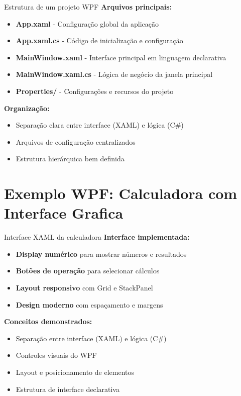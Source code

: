 \documentclass[aspectratio=169]{beamer}
\begin{document}
\begin{frame}{Estrutura de um projeto WPF}
\textbf{Arquivos principais:}
\begin{itemize}
    \item \textbf{App.xaml} - Configuração global da aplicação
    \item \textbf{App.xaml.cs} - Código de inicialização e configuração
    \item \textbf{MainWindow.xaml} - Interface principal em linguagem declarativa
    \item \textbf{MainWindow.xaml.cs} - Lógica de negócio da janela principal
    \item \textbf{Properties/} - Configurações e recursos do projeto
\end{itemize}

\textbf{Organização:}
\begin{itemize}
    \item Separação clara entre interface (XAML) e lógica (C\#)
    \item Arquivos de configuração centralizados
    \item Estrutura hierárquica bem definida
\end{itemize}
\end{frame}

\section{Exemplo WPF: Calculadora com Interface Grafica}

\begin{frame}{Interface XAML da calculadora}
\textbf{Interface implementada:}
\begin{itemize}
    \item \textbf{Display numérico} para mostrar números e resultados
    \item \textbf{Botões de operação} para selecionar cálculos
    \item \textbf{Layout responsivo} com Grid e StackPanel
    \item \textbf{Design moderno} com espaçamento e margens
\end{itemize}

\textbf{Conceitos demonstrados:}
\begin{itemize}
    \item Separação entre interface (XAML) e lógica (C\#)
    \item Controles visuais do WPF
    \item Layout e posicionamento de elementos
    \item Estrutura de interface declarativa
\end{itemize}
\end{frame}
\end{document}

